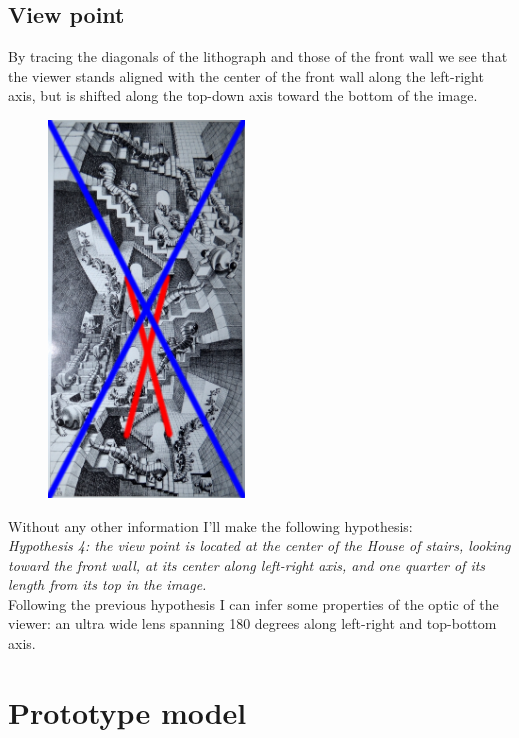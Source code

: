\documentclass[12pt, a4paper]{article}
\begin{document}
\subsection{View point}

By tracing the diagonals of the lithograph and those of the front wall we see that the viewer stands aligned with the center of the front wall along the left-right axis, but is shifted along the top-down axis toward the bottom of the image.\\

\begin{center}
\begin{figure}[H]
\centering\includegraphics[height=10cm]{./viewpoint.png}\\
\end{figure}
\end{center}

Without any other information I'll make the following hypothesis:\\

\emph{Hypothesis 4: the view point is located at the center of the House of stairs, looking toward the front wall, at its center along left-right axis, and one quarter of its length from its top in the image.}\\

Following the previous hypothesis I can infer some properties of the optic of the viewer: an ultra wide lens spanning 180 degrees along left-right and top-bottom axis.\\

\section{Prototype model}
\end{document}
